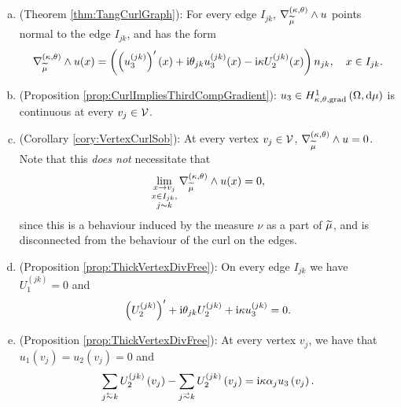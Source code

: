 \begin{enumerate}[(a)]
	\item (Theorem \ref{thm:TangCurlGraph}): For every edge $I_{jk}$, $\nabla_{\widetilde{\mu}}^{\left( \kappa, \theta \right)}\wedge u$ points normal to the edge $I_{jk}$, and has the form
	\begin{align*}
		\nabla_{\widetilde{\mu}}^{\left( \kappa, \theta \right)}\wedge u(x) = \left(  \left( u_3^{(jk)} \right)'(x) + \mathrm{i}\theta_{jk} u_3^{(jk)}(x) - \mathrm{i}\kappa U_2^{(jk)}(x)  \right) n_{jk}, \quad x\in I_{jk}.
	\end{align*}
	\item (Proposition \ref{prop:CurlImpliesThirdCompGradient}): $u_3\in H^1_{\kappa,\theta,\mathrm{grad}}\left( \Omega, \mathrm{d}\mu \right)$ is continuous at every $v_j\in\mathcal{V}$.
	\item (Corollary \ref{cory:VertexCurlSob}): At every vertex $v_j\in\mathcal{V}$, $\nabla_{\widetilde{\mu}}^{\left( \kappa, \theta \right)}\wedge u = 0$.
	Note that this \emph{does not} necessitate that
	\begin{align*}
		\lim_{\substack{x\rightarrow v_j \\ x\in I_{jk}, \\ j\sim k}}\nabla_{\widetilde{\mu}}^{\left( \kappa, \theta \right)}\wedge u(x) = 0,
	\end{align*}
	since this is a behaviour induced by the measure $\nu$ as a part of $\widetilde{\mu}$, and is disconnected from the behaviour of the curl on the edges.
	\item (Proposition \ref{prop:ThickVertexDivFree}): On every edge $I_{jk}$ we have $U_1^{(jk)}=0$ and
	\begin{align*}
		\left( U_2^{(jk)} \right)' + \mathrm{i}\theta_{jk} U_2^{(jk)} + \mathrm{i}\kappa u_3^{(jk)} = 0.
	\end{align*}
	\item (Proposition \ref{prop:ThickVertexDivFree}): At every vertex $v_j$, we have that $u_1(v_j) = u_2(v_j) = 0$ and
	\begin{align*}
		\sum_{j\conRight k} U_2^{(jk)}\bracs{v_j} - \sum_{j\conLeft k} U_2^{(jk)}\bracs{v_j} = \rmi\wavenumber\alpha_j u_3\bracs{v_j}.
	\end{align*}
\end{enumerate}

